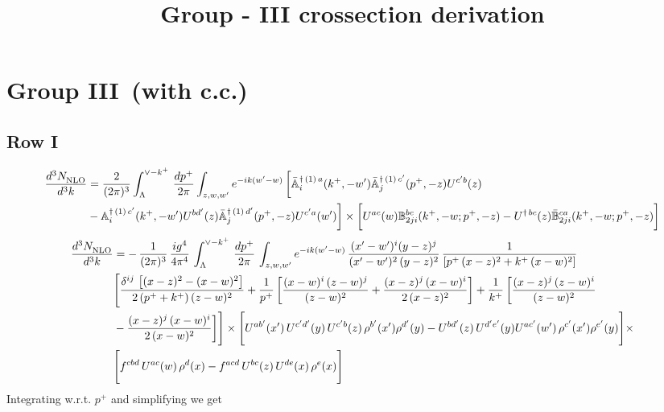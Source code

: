 \documentclass[9pt]{article}
\title{Group - III crossection derivation}
\author{}
\date{}
\def\mf#1{\mathbb{#1}}
\numberwithin{equation}{section}
\begin{document}
\maketitle
\section{Group III\, (with c.c.)}
\subsection{Row I\, }
\begin{align}
 \frac{d^{3}N_{\rm NLO}^{\rm}}{d^{3}k}  & =    \frac{2}{(2\pi)^{3}} \int_{\Lambda}^{\vee - k^{+}}\, \frac{dp^{+}}{2\pi}\int_{z,w,w^{\prime}} e^{-ik(w^{\prime}-w)}\, 
        \bigg[\Bar{\mf{A}}^{\dagger\, (1)\, a}_{i}(k^{+},-w^{\prime})\Bar{\mf{A}}^{\dagger\, (1)\, c^{\prime}}_{j}(p^{+},-z)U^{c^{\prime}b}(z)\notag \\ & -\mf{A}^{\dagger\, (1)\, c^{\prime}}_{i}(k^{+},- w^{\prime})U^{bd^{\prime}}(z)\Bar{\mf{A}}^{\dagger\, (1)\, d^{\prime}}_{j}(p^{+},-z)U^{c^{\prime}a}(w^{\prime})  \bigg]\times \bigg[U^{ac}(w) \mf{B}^{bc}_{2ji}(k^{+},-w;p^{+},-z) -U^{\dagger\, bc}(z)\Bar{\mf{B}}^{ca}_{2ji}(k^{+},-w; p^{+},-z)\bigg] \nonumber
\end{align}
\begin{align}
    \frac{d^{3}N_{\rm NLO}^{\rm}}{d^{3}k}  & =  -\,\frac{1}{(2\pi)^{3}}\,\frac{ig^{4}}{4\pi^{4}}\, \int_{\Lambda}^{\vee-k^{+}}\, \frac{dp^{+}}{2\pi}\, \int_{z,w,w^{\prime}} e^{-ik(w^{\prime}-w)}\, \frac{(x'-w')^{i}(y-z)^{j}}{(x'-w')^{2}\,(y-z)^{2}}\, \frac{1}{\left[p^{+}\,(x-z)^{2}+k^{+}\,(x-w)^{2}\right]}\notag \\ & \Bigg[\frac{\delta^{ij}\, \left[(x-z)^{2}-(x-w)^{2}\right]}{2\, (p^{+}+k^{+})\,(z-w)^{2}}+\frac{1}{p^{+}}\, \bigg[\frac{(x-w)^{i}\,(z-w)^{j}}{(z-w)^{2}}+\frac{(x-z)^{j}\,(x-w)^{i}}{2\,(x-z)^{2}}\bigg]+\frac{1}{k^{+}}\,\bigg[\frac{(x-z)^{j}\,(z-w)^{i}}{(z-w)^{2}}\notag \\ & -\frac{(x-z)^{j}\,(x-w)^{i}}{2\,(x-w)^{2}}\bigg]\Bigg]\times \Bigg[U^{ab'}(x')\,U^{c'd'}(y)\,U^{c'b}(z)\,\rho^{b'}(x')\rho^{d'}(y)-U^{bd'}(z)\,U^{d'e'}(y)U^{ac'}(w')\,\rho^{c'}(x')\rho^{e'}(y)\Bigg]\times \notag \\ & \Bigg[f^{cbd}\,U^{ac}(w)\,\rho^{d}(x)-f^{acd}\, U^{bc}(z)\,U^{de}(x)\,\rho^{e}(x)\Bigg]
\end{align}
Integrating w.r.t. $p^{+}$ and simplifying we get
\end{document}
